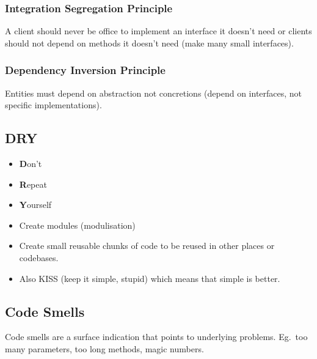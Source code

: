 \subsubsection{Integration Segregation Principle}\label{ssub:integration_segregation_principle}

A client should never be office to implement an interface it doesn't need or clients should not depend on methods it doesn't need (make many small interfaces).

\subsubsection{Dependency Inversion Principle}\label{ssub:dependency_inversion_principle}

Entities must depend on abstraction not concretions (depend on interfaces, not specific implementations).

\subsection{DRY}\label{sub:dry}

\begin{itemize}
	\item \textbf{D}on't
	\item \textbf{R}epeat
	\item \textbf{Y}ourself
\end{itemize}

\begin{itemize}
	\item Create modules (modulisation)
	\item Create small reusable chunks of code to be reused in other places or codebases.
	\item Also KISS (keep it simple, stupid) which means that simple is better.
\end{itemize}

\subsection{Code Smells}\label{sub:code_smells}

Code smells are a surface indication that points to underlying problems.
Eg.\ too many parameters, too long methods, magic numbers.
